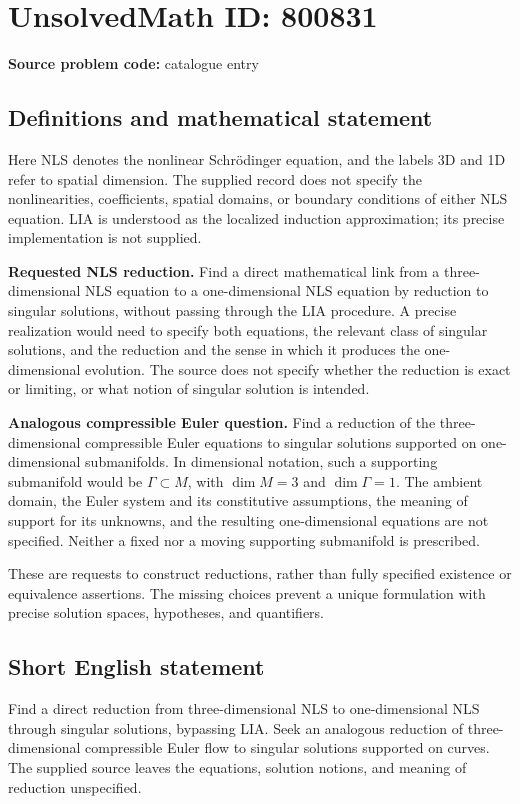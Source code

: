 \documentclass[11pt]{article}
\begin{document}
\section*{UnsolvedMath ID: 800831}
\textbf{Source problem code:} catalogue entry
\subsection{Definitions and mathematical statement}
Here NLS denotes the nonlinear Schr\"odinger equation, and the labels 3D and 1D refer to spatial dimension. The supplied record does not specify the nonlinearities, coefficients, spatial domains, or boundary conditions of either NLS equation. LIA is understood as the localized induction approximation; its precise implementation is not supplied.

\textbf{Requested NLS reduction.} Find a direct mathematical link from a three-dimensional NLS equation to a one-dimensional NLS equation by reduction to singular solutions, without passing through the LIA procedure. A precise realization would need to specify both equations, the relevant class of singular solutions, and the reduction and the sense in which it produces the one-dimensional evolution. The source does not specify whether the reduction is exact or limiting, or what notion of singular solution is intended.

\textbf{Analogous compressible Euler question.} Find a reduction of the three-dimensional compressible Euler equations to singular solutions supported on one-dimensional submanifolds. In dimensional notation, such a supporting submanifold would be \(\Gamma\subset M\), with \(\dim M=3\) and \(\dim\Gamma=1\). The ambient domain, the Euler system and its constitutive assumptions, the meaning of support for its unknowns, and the resulting one-dimensional equations are not specified. Neither a fixed nor a moving supporting submanifold is prescribed.

These are requests to construct reductions, rather than fully specified existence or equivalence assertions. The missing choices prevent a unique formulation with precise solution spaces, hypotheses, and quantifiers.
\subsection{Short English statement}
Find a direct reduction from three-dimensional NLS to one-dimensional NLS through singular solutions, bypassing LIA. Seek an analogous reduction of three-dimensional compressible Euler flow to singular solutions supported on curves. The supplied source leaves the equations, solution notions, and meaning of reduction unspecified.
\end{document}
